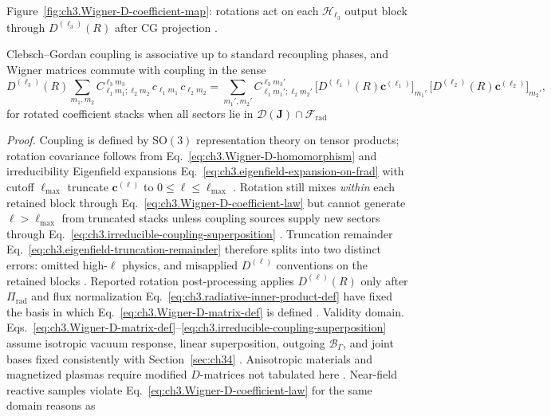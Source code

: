 Figure~\ref{fig:ch3.Wigner-D-coefficient-map}: rotations act on each \(\mathcal{H}_{\ell_3}\) output block through
\(D^{(\ell_3)}(R)\) after CG projection .
\begin{proposition}
\label{prop:ch3.CG-rotation-covariance}
Clebsch--Gordan coupling is associative up to standard recoupling phases, and Wigner matrices commute with
coupling in the sense
\begin{equation}
\label{eq:ch3.CG-Wigner-commutation}
D^{(\ell_3)}(R)
\sum_{m_1,m_2}
C_{\ell_1 m_1;\ell_2 m_2}^{\ell_3 m_3}\,
c_{\ell_1 m_1}\,c_{\ell_2 m_2}
=
\sum_{m_1',m_2'}
C_{\ell_1 m_1';\ell_2 m_2'}^{\ell_3 m_3'}\,
\big[D^{(\ell_1)}(R)\mathbf{c}^{(\ell_1)}\big]_{m_1'}\,
\big[D^{(\ell_2)}(R)\mathbf{c}^{(\ell_2)}\big]_{m_2'},
\end{equation}
for rotated coefficient stacks when all sectors lie in \(\mathcal{D}(\mathbf{J})\cap\mathcal{F}_{\mathrm{rad}}\)
\end{proposition}
\noindent\textit{Proof.}
Coupling is defined by \(\mathrm{SO}(3)\) representation theory on tensor products; rotation covariance follows
from Eq.~\eqref{eq:ch3.Wigner-D-homomorphism} and irreducibility
Eigenfield expansions Eq.~\eqref{eq:ch3.eigenfield-expansion-on-frad} with cutoff \(\ell_{\max}\) truncate
\(\mathbf{c}^{(\ell)}\) to \(0\le\ell\le\ell_{\max}\) . Rotation still mixes
\emph{within} each retained block through Eq.~\eqref{eq:ch3.Wigner-D-coefficient-law} but cannot generate
\(\ell>\ell_{\max}\) from truncated stacks unless coupling sources supply new sectors through
Eq.~\eqref{eq:ch3.irreducible-coupling-superposition} . Truncation remainder
Eq.~\eqref{eq:ch3.eigenfield-truncation-remainder} therefore splits into two distinct errors: omitted high-\(\ell\)
physics, and misapplied \(D^{(\ell)}\) conventions on the retained blocks . Reported rotation
post-processing applies \(D^{(\ell)}(R)\) only after \(\Pi_{\mathrm{rad}}\) and flux normalization
Eq.~\eqref{eq:ch3.radiative-inner-product-def} have fixed the basis in which Eq.~\eqref{eq:ch3.Wigner-D-matrix-def}
is defined .
Validity domain. Eqs.~\eqref{eq:ch3.Wigner-D-matrix-def}--\eqref{eq:ch3.irreducible-coupling-superposition} assume isotropic
vacuum response, linear superposition, outgoing \(\mathcal{B}_\Gamma\), and joint bases fixed consistently with
Section~\ref{sec:ch34} . Anisotropic materials and magnetized plasmas require
modified \(D\)-matrices not tabulated here . Near-field reactive samples violate
Eq.~\eqref{eq:ch3.Wigner-D-coefficient-law} for the same domain reasons as
